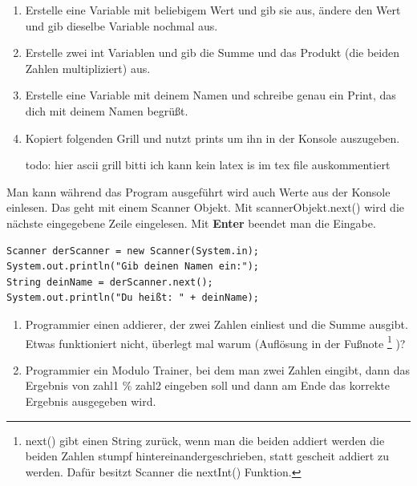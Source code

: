 \documentclass{../../sheet}
\begin{document}
\begin{enumerate}
    \item Erstelle eine Variable mit beliebigem Wert und gib sie aus, ändere den Wert und gib dieselbe Variable nochmal aus.
    \item Erstelle zwei int Variablen und gib die Summe und das Produkt (die beiden Zahlen multipliziert) aus.
    \item Erstelle eine Variable mit deinem Namen und schreibe genau ein Print, das dich mit deinem Namen begrüßt.
    \item Kopiert folgenden Grill und nutzt prints um ihn in der Konsole auszugeben. 
    \begin{ausgabe}
        todo: hier ascii grill bitti ich kann kein latex is im tex file auskommentiert
    \end{ausgabe}
\end{enumerate}

\newpage
{}
Man kann während das Program ausgeführt wird auch Werte aus der Konsole einlesen. Das geht mit einem Scanner Objekt. Mit scannerObjekt.next() wird die nächste eingegebene Zeile eingelesen. Mit \textbf{Enter} beendet man die Eingabe.  
\begin{verbatim}
Scanner derScanner = new Scanner(System.in);
System.out.println("Gib deinen Namen ein:");
String deinName = derScanner.next();
System.out.println("Du heißt: " + deinName);
\end{verbatim}

\begin{enumerate}
    \item Programmier einen addierer, der zwei Zahlen einliest und die Summe ausgibt. Etwas funktioniert nicht, überlegt mal warum (Auflösung in der Fußnote
    \footnote{
        next() gibt einen String zurück, wenn man die beiden addiert werden die beiden Zahlen stumpf hintereinandergeschrieben, statt gescheit addiert zu werden. Dafür besitzt Scanner die nextInt() Funktion.
    }
    )?
    \item Programmier ein Modulo Trainer, bei dem man zwei Zahlen eingibt, dann das Ergebnis von zahl1 \% zahl2 eingeben soll und dann am Ende das korrekte Ergebnis ausgegeben wird.
\end{enumerate}
\end{document}
